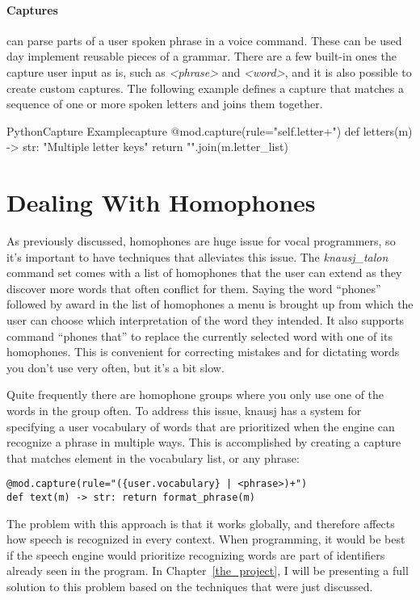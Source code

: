 \documentclass[../thesis.tex]{subfiles}
\begin{document}
\paragraph{Captures}
can parse parts of a user spoken phrase in a voice command.
These can be used day implement reusable pieces of a grammar.
There are a few built-in ones the capture user input as is, such as \textit{<phrase>} and \textit{<word>}, 
and it is also possible to create custom captures.
The following example defines a capture that matches a sequence of one or more spoken letters
and joins them together.
\begin{code}{Python}{Capture Example}{capture}
@mod.capture(rule="{self.letter}+")
def letters(m) -> str:
    "Multiple letter keys"
    return "".join(m.letter_list)
\end{code}


\section{Dealing With Homophones}\label{dealing_with_homophones}
As previously discussed, homophones are huge issue for vocal programmers, 
so it's important to have techniques that alleviates this issue.
The \textit{knausj\_talon} command set comes with a list of homophones that the user can extend
as they discover more words that often conflict for them.
Saying the word ``phones'' followed by award in the list of homophones a menu is brought up
from which the user can choose which interpretation of the word they intended.
It also supports command ``phones that'' to replace the currently selected word with one of its homophones.
This is convenient for correcting mistakes and for dictating words you don't use very often, but it's a bit slow.

Quite frequently there are homophone groups where you only use one of the words in the group often.
To address this issue, knausj has a system for specifying a user vocabulary
of words that are prioritized when the engine can recognize a phrase in multiple ways.
This is accomplished by creating a capture that matches element in the vocabulary list, or any phrase:
\begin{verbatim}
@mod.capture(rule="({user.vocabulary} | <phrase>)+")
def text(m) -> str: return format_phrase(m)
\end{verbatim}

The problem with this approach is that it works globally, and therefore affects
how speech is recognized in every context.
When programming, it would be best if the speech engine would prioritize recognizing
words are part of identifiers already seen in the program.
In Chapter~\ref{the_project}, I will be presenting a full solution to this problem
based on the techniques that were just discussed.
\end{document}
